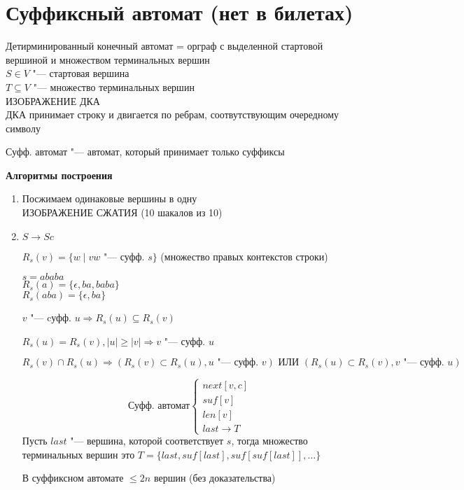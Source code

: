 \section{Суффиксный автомат (нет в билетах)}

\begin{Def}
	Детирминированный конечный автомат = орграф с выделенной стартовой вершиной и множеством терминальных вершин \\
	$S \in V$ "--- стартовая вершина \\
	$T \subseteq V$ "--- множество терминальных вершин \\
	ИЗОБРАЖЕНИЕ ДКА \\
	ДКА принимает строку и двигается по ребрам, соотвутствующим очередному символу
\end{Def}

\begin{Def}
	Суфф. автомат "--- автомат, который принимает только суффиксы
\end{Def}

\textbf{Алгоритмы построения}
\begin{enumerate}
	\item
		Посжимаем одинаковые вершины в одну \\
		ИЗОБРАЖЕНИЕ СЖАТИЯ (10 шакалов из 10)
	\item
		$S \to Sc$
		\begin{Def}
			$R_s(v) = \{ w \mid vw$ "--- суфф. $s \}$ (множество правых контекстов строки) 
		\end{Def}
		\begin{exmp}
			$s = ababa$ \\
			$R_s(a) = \{\epsilon, ba, baba \}$ \\
			$R_s(aba) = \{\epsilon, ba \}$
		\end{exmp}
		\begin{lemma}
			$v$ "--- cуфф. $u \Rightarrow R_s(u) \subseteq R_s(v)$
		\end{lemma}
		\begin{lemma}
			$R_s(u) = R_s(v), |u| \geqslant |v| \Rightarrow v$ "--- суфф. $u$
		\end{lemma}
		\begin{lemma}
			$R_s(v) \cap R_s(u) \Rightarrow (R_s(v) \subset R_s(u), \text{$u$ "--- суфф. $v$}) \text{ ИЛИ } (R_s(u) \subset R_s(v), \text{$v$ "--- суфф. $u$})$
		\end{lemma}
		\begin{equation*}
		\text{Суфф. автомат}
		\begin{cases}
			next[v,c] \\
			suf[v] \\
			len[v] \\
			last \to T
			 
		\end{cases}
	\end{equation*}
	Пусть $last$ "--- вершина, которой соответствует $s$, тогда множество терминальных вершин это $T = \{last, suf[last], suf[suf[last]], \dots \}$
	\begin{lemma}
		В суффиксном автомате $\leqslant 2n$ вершин (без доказательства) 
	\end{lemma}
\end{enumerate}